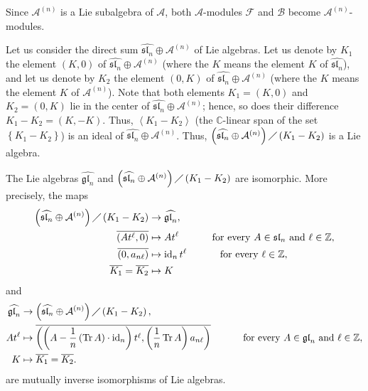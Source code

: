 \documentclass[etingof-lie.tex]{subfiles}
\begin{document}
Since $\mathcal{A}^{\left(  n\right)  }$ is a Lie subalgebra of $\mathcal{A}$,
both $\mathcal{A}$-modules $\mathcal{F}$ and $\mathcal{B}$ become
$\mathcal{A}^{\left(  n\right)  }$-modules.

Let us consider the direct sum $\widehat{\mathfrak{sl}_{n}}\oplus
\mathcal{A}^{\left(  n\right)  }$ of Lie algebras. Let us denote by $K_{1}$
the element $\left(  K,0\right)  $ of $\widehat{\mathfrak{sl}_{n}}%
\oplus\mathcal{A}^{\left(  n\right)  }$ (where the $K$ means the element $K$
of $\widehat{\mathfrak{sl}_{n}}$), and let us denote by $K_{2}$ the element
$\left(  0,K\right)  $ of $\widehat{\mathfrak{sl}_{n}}\oplus\mathcal{A}%
^{\left(  n\right)  }$ (where the $K$ means the element $K$ of $\mathcal{A}%
^{\left(  n\right)  }$). Note that both elements $K_{1}=\left(  K,0\right)  $
and $K_{2}=\left(  0,K\right)  $ lie in the center of $\widehat{\mathfrak{sl}%
_{n}}\oplus\mathcal{A}^{\left(  n\right)  }$; hence, so does their difference
$K_{1}-K_{2}=\left(  K,-K\right)  $. Thus, $\left\langle K_{1}-K_{2}%
\right\rangle $ (the $\mathbb{C}$-linear span of the set $\left\{  K_{1}%
-K_{2}\right\}  $) is an ideal of $\widehat{\mathfrak{sl}_{n}}\oplus
\mathcal{A}^{\left(  n\right)  }$. Thus, $\left(  \widehat{\mathfrak{sl}_{n}%
}\oplus\mathcal{A}^{\left(  n\right)  }\right)  \diagup\left(  K_{1}%
-K_{2}\right)  $ is a Lie algebra.

\begin{proposition}
The Lie algebras $\widehat{\mathfrak{gl}_{n}}$ and $\left(
\widehat{\mathfrak{sl}_{n}}\oplus\mathcal{A}^{\left(  n\right)  }\right)
\diagup\left(  K_{1}-K_{2}\right)  $ are isomorphic. More precisely, the maps%
\begin{align*}
\left(  \widehat{\mathfrak{sl}_{n}}\oplus\mathcal{A}^{\left(  n\right)
}\right)  \diagup\left(  K_{1}-K_{2}\right)   &  \rightarrow
\widehat{\mathfrak{gl}_{n}},\\
\overline{\left(  At^{\ell},0\right)  }  &  \mapsto At^{\ell}%
\ \ \ \ \ \ \ \ \ \ \text{for every }A\in\mathfrak{sl}_{n}\text{ and }\ell
\in\mathbb{Z},\\
\overline{\left(  0,a_{n\ell}\right)  }  &  \mapsto\operatorname*{id}%
\nolimits_{n}t^{\ell}\ \ \ \ \ \ \ \ \ \ \text{for every }\ell\in\mathbb{Z},\\
\overline{K_{1}}=\overline{K_{2}}  &  \mapsto K
\end{align*}
and%
\begin{align*}
\widehat{\mathfrak{gl}_{n}}  &  \rightarrow\left(  \widehat{\mathfrak{sl}_{n}%
}\oplus\mathcal{A}^{\left(  n\right)  }\right)  \diagup\left(  K_{1}%
-K_{2}\right)  ,\\
At^{\ell}  &  \mapsto\overline{\left(  \left(  A-\dfrac{1}{n}\left(
\operatorname*{Tr}A\right)  \cdot\operatorname*{id}\nolimits_{n}\right)
t^{\ell},\left(  \dfrac{1}{n}\operatorname*{Tr}A\right)  a_{n\ell}\right)
}\ \ \ \ \ \ \ \ \ \ \text{for every }A\in\mathfrak{gl}_{n}\text{ and }\ell
\in\mathbb{Z},\\
K  &  \mapsto\overline{K_{1}}=\overline{K_{2}}.
\end{align*}
are mutually inverse isomorphisms of Lie algebras.
\end{proposition}
\end{document}
